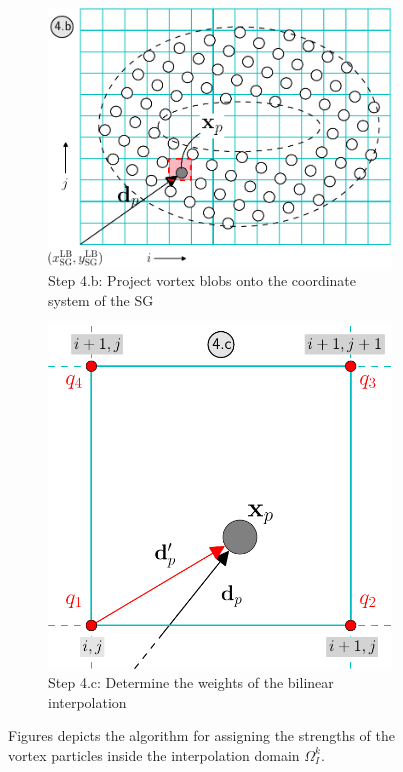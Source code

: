 \begin{figure}[p]
\begin{subfigure}[t]{0.5\textwidth}
			\includegraphics[width=\linewidth]{./figures/coupling/assignStrength/assignStrength_part2-crop.pdf}
			\caption{Step 4.b: Project vortex blobs onto the coordinate system of the SG}
			\label{fig:assignStrength_part2}
		 \end{subfigure}%
		 \qquad \qquad \qquad \qquad \qquad
	     \begin{subfigure}[t]{0.4\textwidth}
			\includegraphics[width=\linewidth]{./figures/coupling/assignStrength/assignStrength_part3-crop.pdf}
			\caption{Step 4.c: Determine the weights of the bilinear interpolation}
			\label{fig:assignStrength_part3}
		 \end{subfigure}%
	
	     \caption{Figures depicts the algorithm for assigning the strengths of the vortex particles inside the interpolation domain $\Omega_{I}^k$.}
	     \label{fig:assignStrength}
		\end{figure}		
	
